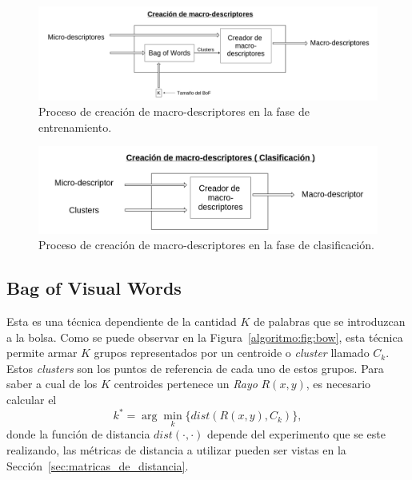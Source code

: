 	\begin{figure}[bt]
		\centering
    		\includegraphics[width=1\textwidth]{Figuras/Diagramas/Extractor_macrodescriptores_entrenamiento.png}
  		\caption{Proceso de creación de macro-descriptores en la fase de entrenamiento.}
  		\label{algoritmo:fig:macro_descriptores:entrenamiento}
	\end{figure}	
	
	
	\begin{figure}[bt]
		\centering
    		\includegraphics[width=1\textwidth]{Figuras/Diagramas/Extractor_macrodescriptores_clasificacion.png}
  		\caption{Proceso de creación de macro-descriptores en la fase de clasificación.}
  		\label{algoritmo:fig:macro_descriptores:clasificacion}
	\end{figure}	



	\subsection{Bag of Visual Words}
	\label{algoritmo:bow}
		Esta es una técnica dependiente de la cantidad $K$ de palabras que se introduzcan a la bolsa. Como se puede observar en la Figura~\ref{algoritmo:fig:bow}, esta técnica permite armar $K$ grupos representados por un centroide o \textit{cluster} llamado $C_k$. Estos \textit{clusters} son los puntos de referencia de cada uno de estos grupos. Para saber a cual de los $K$ centroides pertenece un \textit{Rayo} $R(x,y)$, es necesario calcular el
		\begin{equation}
  			\label{algoritmo:eq:dist}
			k^* = \arg \min_k \{\mathit{dist}(R(x,y),C_k)\},
		\end{equation}
		donde la función de distancia $\mathit{dist}(\cdot,\cdot)$ depende del experimento que se este realizando, las métricas de distancia a utilizar pueden ser vistas en la Sección~\ref{sec:matricas_de_distancia}.


